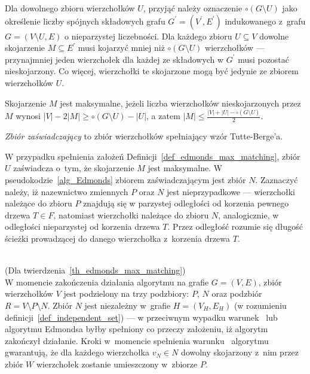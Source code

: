 {  Dla dowolnego zbioru wierzchołków $U$, przyjąć należy oznaczenie $\circ (G \setminus U)$ jako określenie liczby spójnych składowych grafu $G^\prime=(V^\prime, E^\prime)$ indukowanego z~grafu $G=(V \setminus U, E)$ o nieparzystej liczebności.
  Dla każdego zbioru $U \subseteq V$ dowolne skojarzenie $M \subseteq E^\prime$ musi kojarzyć mniej niż $\circ (G \setminus U)$ wierzchołków --- przynajmniej jeden wierzchołek dla każdej ze składowych w $G^\prime$ musi pozostać nieskojarzony.
  Co więcej, wierzchołki te skojarzone mogą być jedynie ze zbiorem wierzchołków $U$.
  \begin{definition}
    Skojarzenie $M$ jest maksymalne, jeżeli liczba wierzchołków nieskojarzonych przez $M$ wynosi $|V| - 2|M| \geq \circ (G \setminus U) - |U|$, a zatem $|M|\leq \frac{|V|+|U| - \circ (G \setminus U)}{2}$.
  \end{definition}
  \begin{definition}
  \emph{Zbiór zaświadczający} to zbiór wierzchołków spełniający wzór Tutte-Berge'a.
  \end{definition}
  W przypadku spełnienia założeń Definicji~\ref{def_edmonds_max_matching}, zbiór $U$ zaświadcza o~tym, że skojarzenie $M$ jest maksymalne.
  W pseudokodzie~\ref{alg_Edmonds} zbiorem zaświadczającym jest zbiór $N$.
  Zaznaczyć należy, iż nazewnictwo zmiennych $P$ oraz $N$ jest nieprzypadkowe --- wierzchołki należące do zbioru $P$ znajdują się w parzystej odległości od korzenia pewnego drzewa $T \in F$, natomiast wierzchołki należące do zbioru $N$, analogicznie, w odległości nieparzystej od korzenia drzewa $T$.
  Przez odległość rozumie się długość ścieżki prowadzącej do danego wierzchołka z~korzenia drzewa $T$.\\\\
  \begin{bproof} (Dla twierdzenia~\ref{th_edmonds_max_matching})\\
    W momencie zakończenia działania algorytmu na grafie $G=(V, E)$, zbiór wierzchołków $V$ jest podzielony na trzy podzbiory: $P$, $N$ oraz podzbiór $R = V \setminus P \setminus N$.
    Zbiór $N$ jest niezależny w~grafie $H=(V_H, E_H)$ (w rozumieniu definicji~\ref{def_independent_set}) --- w przeciwnym wypadku warunek~ lub~ algorytmu Edmondsa byłby spełniony co przeczy założeniu, iż algorytm zakończył działanie.
    Kroki w~momencie spełnienia warunku~ algorytmu gwarantują, że dla każdego wierzchołka $v_N \in N$ dowolny skojarzony z~nim przez zbiór $W$ wierzchołek zostanie umieszczony w~zbiorze $P$.

\end{bproof}}
